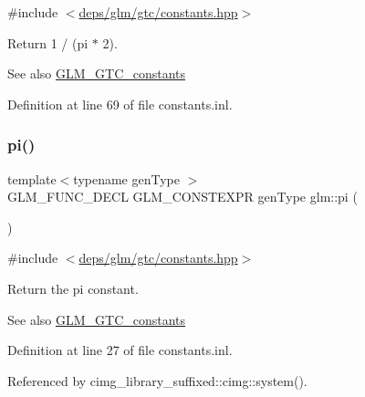{\ttfamily \#include $<$\hyperlink{constants_8hpp}{deps/glm/gtc/constants.\+hpp}$>$}

Return 1 / (pi $\ast$ 2). \begin{DoxySeeAlso}{See also}
\hyperlink{group__gtc__constants}{G\+L\+M\+\_\+\+G\+T\+C\+\_\+constants} 
\end{DoxySeeAlso}


Definition at line 69 of file constants.\+inl.

\mbox{\label{group__gtc__constants_ga94bafeb2a0f23ab6450fed1f98ee4e45}} 
\subsubsection{\texorpdfstring{pi()}{pi()}}
{\footnotesize\ttfamily template$<$typename gen\+Type $>$ \\
G\+L\+M\+\_\+\+F\+U\+N\+C\+\_\+\+D\+E\+CL G\+L\+M\+\_\+\+C\+O\+N\+S\+T\+E\+X\+PR gen\+Type glm\+::pi (\begin{DoxyParamCaption}{ }\end{DoxyParamCaption})}



{\ttfamily \#include $<$\hyperlink{constants_8hpp}{deps/glm/gtc/constants.\+hpp}$>$}

Return the pi constant. \begin{DoxySeeAlso}{See also}
\hyperlink{group__gtc__constants}{G\+L\+M\+\_\+\+G\+T\+C\+\_\+constants} 
\end{DoxySeeAlso}


Definition at line 27 of file constants.\+inl.



Referenced by cimg\+\_\+library\+\_\+suffixed\+::cimg\+::system().

